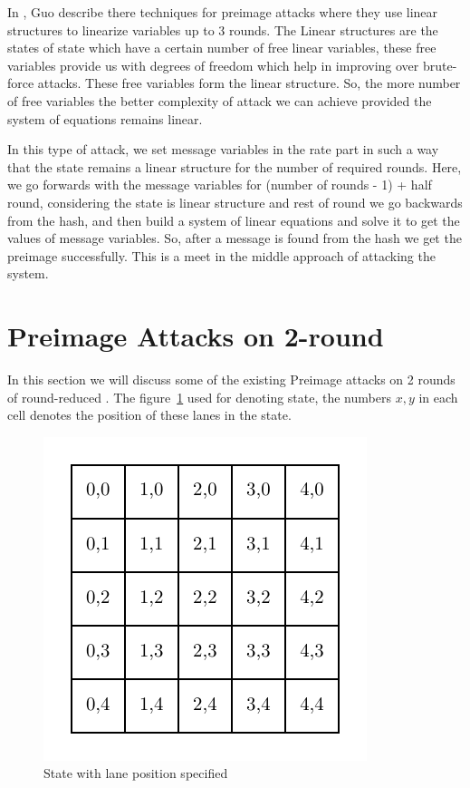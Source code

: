 In \cite{guo2016linear}, Guo \etal describe there techniques for preimage attacks where they use linear structures to linearize variables up to 3 rounds. The Linear structures are the states of \KECCAK{} state which have a certain number of free linear variables, these free variables provide us with degrees of freedom which help in improving over brute-force attacks. These free variables form the linear structure. So, the more number of free variables the better complexity of attack we can achieve provided the system of equations remains linear.

In this type of attack, we set message variables in the rate part in such a way that the state remains a linear structure for the number of required rounds. Here, we go forwards with the message variables for (number of rounds - 1) + half round, considering the state is linear structure and rest of round we go backwards from the hash, and then build a system of linear equations and solve it to get the values of message variables. So, after a message is found from the hash we get the preimage successfully. This is a meet in the middle approach of attacking the system.

\section{Preimage Attacks on 2-round \KECCAK}

In this section we will discuss some of the existing Preimage attacks on 2 rounds of round-reduced \KECCAK{}. The figure~\ref{fig:linkeccakstate} used for denoting \KECCAK{} state, the numbers $x,y$ in each cell denotes the position of these lanes in the state.

\begin{figure}
    \centering
    \includegraphics{keccakState.pdf}
    \caption{\KECCAK{} State with lane position specified}
    \label{fig:linkeccakstate}
\end{figure}


